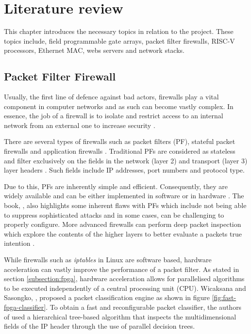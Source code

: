 \chapter[Literature review]{Literature review }
\label{Chap:label}	%
\pagestyle{headings}

This chapter introduces the necessary topics in relation to the project. These topics include, field programmable gate arrays, packet filter firewalls, RISC-V processors, Ethernet MAC, webs servers and network stacks.  








\section{Packet Filter Firewall}

Usually, the first line of defence against bad actors, firewalls play a vital component in computer networks and as such can become vastly complex. 
In essence, the job of a firewall is to isolate and restrict access to an internal network from an external one to increase security \cite{BuildingInternetFirewalls}.

There are several types of firewalls such as packet filters (PF), stateful packet firewalls and application firewalls \cite{FirewallsBook}. 
Traditional PFs are considered as stateless and filter exclusively on the fields in the network (layer 2) and transport 
(layer 3) layer headers \cite{FirewallsBook}. Such fields include IP addresses, port numbers and protocol type.

Due to this, PFs are inherently simple and efficient. Consequently, they are widely available and can be either implemented in software or in 
hardware \cite{BuildingInternetFirewalls}. The book, \cite{BuildingInternetFirewalls}, also highlights some inherent flaws with PFs which include not being able 
to suppress sophisticated attacks and in some cases, can be challenging to properly configure. More advanced firewalls can perform deep packet inspection which 
explore the contents of the higher layers to better evaluate a packets true intention \cite{FirewallsBook}. 

While firewalls such as \textit{iptables} in Linux are software based, hardware acceleration can vastly improve the performance of a packet filter. As stated in section 
\ref{subsection:fpga}, hardware acceleration allows for parallelised algorithms to be executed independently of a central processing unit (CPU). Wicaksana and Sasongko, 
\cite{FastRecongifFPGAFirewall}, proposed a packet classification engine as shown in figure \ref{fig:fast-fpga-classifier}. To obtain a fast and reconfigurable packet 
classifier, the authors of \cite{FastRecongifFPGAFirewall} used a hierarchical tree-based algorithm that inspects the multidimensional fields of the IP header through 
the use of parallel decision trees.

